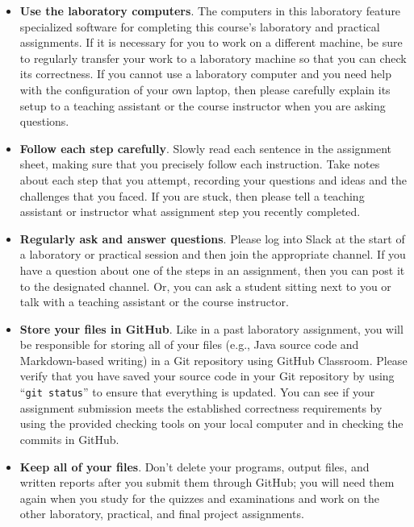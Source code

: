 \documentclass[11pt]{article}
\newcommand{\command}[1]{``\lstinline{#1}''}
\begin{document}
\begin{itemize}
  \setlength{\itemsep}{0pt}

\item {\bf Use the laboratory computers}. The computers in this laboratory
  feature specialized software for completing this course's laboratory and
  practical assignments. If it is necessary for you to work on a different
  machine, be sure to regularly transfer your work to a laboratory machine so
  that you can check its correctness. If you cannot use a laboratory computer
  and you need help with the configuration of your own laptop, then please
  carefully explain its setup to a teaching assistant or the course instructor
  when you are asking questions.

\item {\bf Follow each step carefully}. Slowly read each sentence in the
  assignment sheet, making sure that you precisely follow each instruction. Take
  notes about each step that you attempt, recording your questions and ideas and
  the challenges that you faced. If you are stuck, then please tell a teaching
  assistant or instructor what assignment step you recently completed.

\item {\bf Regularly ask and answer questions}. Please log into Slack at the
  start of a laboratory or practical session and then join the appropriate
  channel. If you have a question about one of the steps in an assignment, then
  you can post it to the designated channel. Or, you can ask a student sitting
  next to you or talk with a teaching assistant or the course instructor.

\item {\bf Store your files in GitHub}. Like in a past laboratory assignment,
  you will be responsible for storing all of your files (e.g., Java source code
  and Markdown-based writing) in a Git repository using GitHub Classroom. Please
  verify that you have saved your source code in your Git repository by using
  \command{git status} to ensure that everything is updated. You can see if your
  assignment submission meets the established correctness requirements by using
  the provided checking tools on your local computer and in checking the commits
  in GitHub.

\item {\bf Keep all of your files}. Don't delete your programs, output files,
  and written reports after you submit them through GitHub; you will need them
  again when you study for the quizzes and examinations and work on the other
  laboratory, practical, and final project assignments.


\end{itemize}
\end{document}
